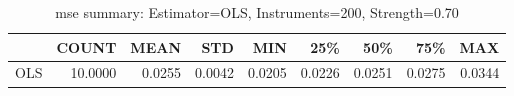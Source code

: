 \begin{table}[ht]
\centering
\caption{mse summary: Estimator=OLS, Instruments=200, Strength=0.70}
\begin{tabular}{lrrrrrrrr}
\toprule
 & COUNT & MEAN & STD & MIN & 25\% & 50\% & 75\% & MAX \\
\midrule
OLS & 10.0000 & 0.0255 & 0.0042 & 0.0205 & 0.0226 & 0.0251 & 0.0275 & 0.0344 \\
\bottomrule
\end{tabular}
\end{table}

